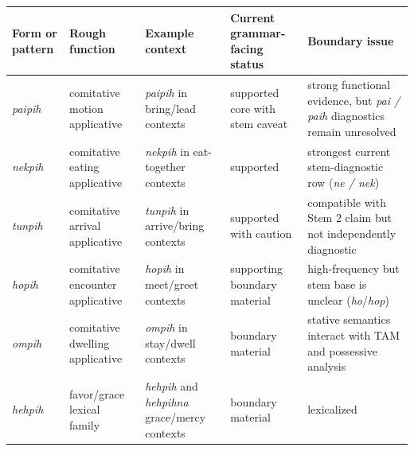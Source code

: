 \documentclass[
  11pt,
  a4paper,
]{article}
\newcounter{none} %
\newcommand{\tdim}[1]{\textit{#1}}
\begin{document}
{\def\LTcaptype{none} %
\begin{longtable}[]{@{}
  >{\raggedright\arraybackslash}p{}
  >{\raggedright\arraybackslash}p{}
  >{\raggedright\arraybackslash}p{}
  >{\raggedright\arraybackslash}p{}
  >{\raggedright\arraybackslash}p{}@{}}
\toprule\noalign{}
\begin{minipage}[b]{\linewidth}\raggedright
Form or pattern
\end{minipage} & \begin{minipage}[b]{\linewidth}\raggedright
Rough function
\end{minipage} & \begin{minipage}[b]{\linewidth}\raggedright
Example context
\end{minipage} & \begin{minipage}[b]{\linewidth}\raggedright
Current grammar-facing status
\end{minipage} & \begin{minipage}[b]{\linewidth}\raggedright
Boundary issue
\end{minipage} \\
\midrule\noalign{}
\endhead
\bottomrule\noalign{}
\endlastfoot
\tdim{paipih} & comitative motion applicative & \tdim{paipih} in
bring/lead contexts & supported core with stem caveat & strong
functional evidence, but \tdim{pai / paih} diagnostics remain
unresolved \\
\tdim{nekpih} & comitative eating applicative & \tdim{nekpih} in
eat-together contexts & supported & strongest current stem-diagnostic
row (\tdim{ne / nek}) \\
\tdim{tunpih} & comitative arrival applicative & \tdim{tunpih} in
arrive/bring contexts & supported with caution & compatible with Stem 2
claim but not independently diagnostic \\
\tdim{hopih} & comitative encounter applicative & \tdim{hopih} in
meet/greet contexts & supporting boundary material & high-frequency but
stem base is unclear (\tdim{ho}/\tdim{hop}) \\
\tdim{ompih} & comitative dwelling applicative & \tdim{ompih} in
stay/dwell contexts & boundary material & stative semantics interact
with TAM and possessive analysis \\
\tdim{hehpih} & favor/grace lexical family & \tdim{hehpih} and
\tdim{hehpihna} grace/mercy contexts & boundary material & lexicalized

\end{longtable}}
\end{document}
